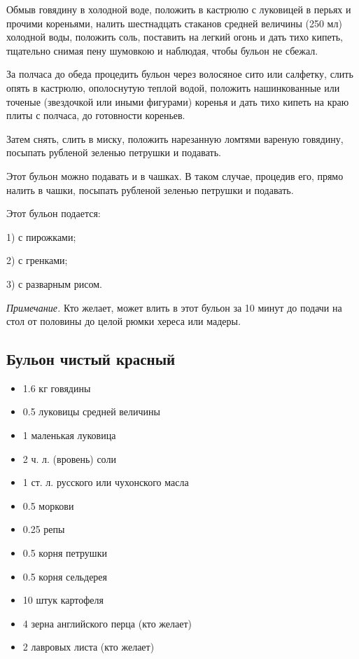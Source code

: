 Обмыв говядину в холодной воде, положить в кастрюлю с луковицей в перьях и прочими кореньями, налить шестнадцать стаканов средней величины (250 мл) холодной воды, положить соль, поставить на легкий огонь и дать тихо кипеть, тщательно снимая пену шумовкою и наблюдая, чтобы бульон не сбежал.

За полчаса до обеда процедить бульон через волосяное сито или салфетку, слить опять в кастрюлю, ополоснутую теплой водой, положить нашинкованные или точеные (звездочкой или иными фигурами) коренья и дать тихо кипеть на краю плиты с полчаса, до готовности кореньев.

Затем снять, слить в миску, положить нарезанную ломтями вареную говядину, посыпать рубленой зеленью петрушки и подавать.

Этот бульон можно подавать и в чашках. В таком случае, процедив его, прямо налить в чашки, посыпать рубленой зеленью петрушки и подавать.

Этот бульон подается:

1) с пирожками;

2) с гренками;

3) с разварным рисом.

 \emph{Примечание.} Кто желает, может влить в этот бульон за 10 минут до подачи на стол от половины до целой рюмки хереса или мадеры.

\subsection{Бульон чистый красный}\label{2bul-krasn}

\begin{itemize}
	\item 1.6 кг говядины 
    \item  0.5 луковицы средней величины 
    \item  1 маленькая луковица 
    \item  2 ч. л. (вровень) соли 
    \item  1 ст. л. русского или чухонского масла 
    \item  0.5 моркови 
    \item  0.25 репы 
    \item  0.5 корня петрушки 
    \item  0.5 корня сельдерея 
    \item  10 штук картофеля 
    \item  4 зерна английского перца (кто желает) 
    \item  2 лавровых листа (кто желает)
\end{itemize}

